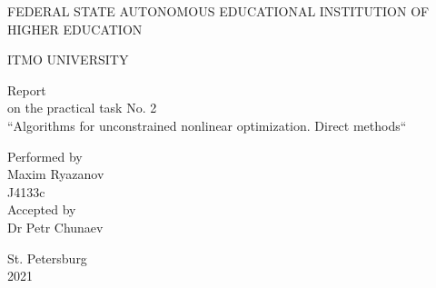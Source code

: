 \documentclass[12pt,a4paper]{report}
\begin{document}
	\vspace*{15ex}
	\begin{center}
		FEDERAL STATE AUTONOMOUS EDUCATIONAL INSTITUTION OF HIGHER EDUCATION 
		
		ITMO UNIVERSITY
		\vspace*{30ex}
		
		Report\\
		on the practical task No. 2\\
		``Algorithms for unconstrained nonlinear optimization. Direct methods``
	\end{center}
	\vspace{25ex}
	\begin{flushright}
		Performed by\\
		Maxim Ryazanov\\
		J4133c\\
		Accepted by\\
		Dr Petr Chunaev
	\end{flushright}
	\vspace{20ex}
	\begin{center}
		St. Petersburg\\
		2021
	\end{center}
	\newpage

    
	
	
	
	
\end{document}
